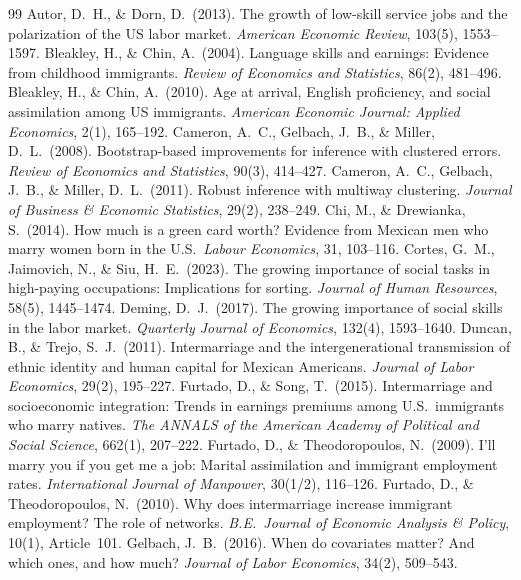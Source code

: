 \documentclass[11pt]{article}
\begin{document}
\FloatBarrier
\clearpage
\begin{thebibliography}{99}
 Autor, D.~H., \& Dorn, D.\ (2013). The growth of low-skill service jobs and the polarization of the US labor market. \textit{American Economic Review}, 103(5), 1553--1597.
 Bleakley, H., \& Chin, A.\ (2004). Language skills and earnings: Evidence from childhood immigrants. \textit{Review of Economics and Statistics}, 86(2), 481--496.
 Bleakley, H., \& Chin, A.\ (2010). Age at arrival, English proficiency, and social assimilation among US immigrants. \textit{American Economic Journal: Applied Economics}, 2(1), 165--192.
 Cameron, A.~C., Gelbach, J.~B., \& Miller, D.~L.\ (2008). Bootstrap-based improvements for inference with clustered errors. \textit{Review of Economics and Statistics}, 90(3), 414--427.
 Cameron, A.~C., Gelbach, J.~B., \& Miller, D.~L.\ (2011). Robust inference with multiway clustering. \textit{Journal of Business \& Economic Statistics}, 29(2), 238--249.
 Chi, M., \& Drewianka, S.\ (2014). How much is a green card worth? Evidence from Mexican men who marry women born in the U.S.\ \textit{Labour Economics}, 31, 103--116.
 Cortes, G.~M., Jaimovich, N., \& Siu, H.~E.\ (2023). The growing importance of social tasks in high-paying occupations: Implications for sorting. \textit{Journal of Human Resources}, 58(5), 1445--1474.
 Deming, D.~J.\ (2017). The growing importance of social skills in the labor market. \textit{Quarterly Journal of Economics}, 132(4), 1593--1640.
 Duncan, B., \& Trejo, S.~J.\ (2011). Intermarriage and the intergenerational transmission of ethnic identity and human capital for Mexican Americans. \textit{Journal of Labor Economics}, 29(2), 195--227.
 Furtado, D., \& Song, T.\ (2015). Intermarriage and socioeconomic integration: Trends in earnings premiums among U.S.\ immigrants who marry natives. \textit{The ANNALS of the American Academy of Political and Social Science}, 662(1), 207--222.
 Furtado, D., \& Theodoropoulos, N.\ (2009). I'll marry you if you get me a job: Marital assimilation and immigrant employment rates. \textit{International Journal of Manpower}, 30(1/2), 116--126.
 Furtado, D., \& Theodoropoulos, N.\ (2010). Why does intermarriage increase immigrant employment? The role of networks. \textit{B.E.\ Journal of Economic Analysis \& Policy}, 10(1), Article~101.
 Gelbach, J.~B.\ (2016). When do covariates matter? And which ones, and how much? \textit{Journal of Labor Economics}, 34(2), 509--543.

\end{thebibliography}
\end{document}
